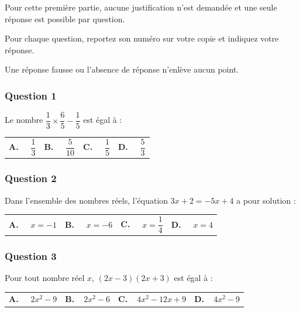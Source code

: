 Pour cette première partie, aucune justification n'est demandée et une seule réponse est possible par question.

Pour chaque question, reportez son numéro sur votre copie et indiquez votre réponse.

Une réponse fausse ou l'absence de réponse n'enlève aucun point.

\subsubsection*{Question 1}
Le nombre $\dfrac{1}{3} \times \dfrac{6}{5}-\dfrac{1}{5}$ est égal à :

\begin{center}
\begin{tabularx}{\linewidth}{*{4}{X}}
\textbf{A.~~} $\dfrac13$ &\textbf{B.~~} $\dfrac{5}{10}$ &\textbf{C.~~} $\dfrac15$ &\textbf{D.~~} $\dfrac53$\\
\end{tabularx}
\end{center}

\subsubsection*{Question 2}

Dans l'ensemble des nombres réels, l'équation $3 x+2= -5 x+4$ a pour solution :

\begin{center}
\begin{tabularx}{\linewidth}{*{4}{X}}
\textbf{A.~~} $x = - 1$ &\textbf{B.~~} $x = - 6$ &\textbf{C.~~} $x= \dfrac14$ &\textbf{D.~~} $x = 4$\\
\end{tabularx}
\end{center}

\subsubsection*{Question 3}
Pour tout nombre réel $x$, \quad$(2x -3)(2x + 3)$ \quad est égal à :

\begin{center}
\begin{tabularx}{\linewidth}{*{4}{X}}
\textbf{A.~~} $2x^2 - 9$&\textbf{B.~~}$2x^2-6$&\textbf{C.~~}$4x^2- 12x + 9$&
\textbf{D.~~}$4x^2 - 9$\\
\end{tabularx}
\end{center}

